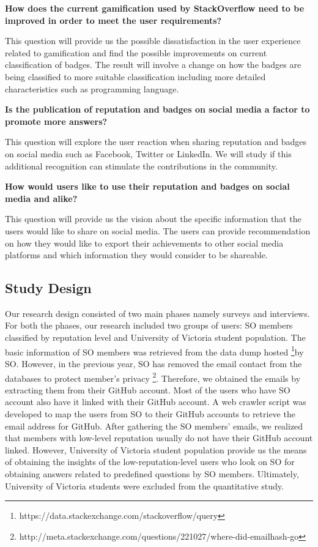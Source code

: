 \documentclass{sigchi}
\begin{document}
\textbf{How does the current gamification used by StackOverflow need to be improved in order to meet the user requirements?}

This question will provide us the possible dissatisfaction in the user experience related to gamification and find the possible improvements on current classification of badges. The result will involve a change on how the badges are being classified to more suitable classification including more detailed characteristics such as programming language.

\textbf{Is the publication of reputation and badges on social media a
factor to promote more answers?}

This question will explore the user reaction when sharing reputation and badges on social media such as Facebook, Twitter or LinkedIn. We will study if this additional recognition can stimulate the contributions in the community.

\textbf{How would users like to use their reputation and badges
on social media and alike?}

This question will provide us the vision about the specific information that the users would like to share on social media. The users can provide recommendation on how they would like to export their achievements to other social media platforms and which information they would consider to be shareable.

\subsection{Study Design}
Our research design consisted of two main phases namely surveys and interviews. For both the phases, our research included two groups of users: SO members classified by reputation level and University of Victoria student population. The basic information of SO members was retrieved from the data dump hosted \footnote{https://data.stackexchange.com/stackoverflow/query}by SO. However, in the previous year, SO has removed the email contact from the databases to protect member's privacy \footnote{http://meta.stackexchange.com/questions/221027/where-did-emailhash-go}. Therefore, we obtained the emails by extracting them from their GitHub account. Most of the users who have SO account also have it linked with their GitHub account. A web crawler script was developed to map the users from SO to their GitHub accounts to retrieve the email address for GitHub. After gathering the SO members' emails, we realized that members with low-level reputation usually do not have their GitHub account linked. However, University of Victoria student population provide us the means of obtaining the insights of the low-reputation-level users who look on SO for obtaining answers related to predefined questions by SO members. Ultimately, University of Victoria students were excluded from the quantitative study.
\end{document}
